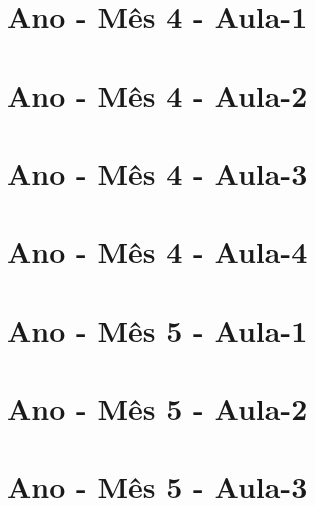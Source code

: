 \begin{multicols}{2}
\section[\sffamily 1\textordmasculine\space Ano - M\^{e}s 4 - Aula-1]{\textordmasculine\space Ano - M\^{e}s 4 - Aula-1}


\section[\sffamily 1\textordmasculine\space Ano - M\^{e}s 4 - Aula-2]{\textordmasculine\space Ano - M\^{e}s 4 - Aula-2}


\section[\sffamily 1\textordmasculine\space Ano - M\^{e}s 4 - Aula-3]{\textordmasculine\space Ano - M\^{e}s 4 - Aula-3}


\section[\sffamily 1\textordmasculine\space Ano - M\^{e}s 4 - Aula-4]{\textordmasculine\space Ano - M\^{e}s 4 - Aula-4}


\section[\sffamily 1\textordmasculine\space Ano - M\^{e}s 5 - Aula-1]{\textordmasculine\space Ano - M\^{e}s 5 - Aula-1}


\section[\sffamily 1\textordmasculine\space Ano - M\^{e}s 5 - Aula-2]{\textordmasculine\space Ano - M\^{e}s 5 - Aula-2}


\section[\sffamily 1\textordmasculine\space Ano - M\^{e}s 5 - Aula-3]{\textordmasculine\space Ano - M\^{e}s 5 - Aula-3}



\end{multicols}
